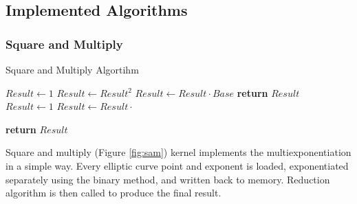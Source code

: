 \subsection{Implemented Algorithms}


\subsubsection{Square and Multiply}

\begin{algorithm}[h]
    \caption{Square and Multiply Algortihm \cite{knuth2014art}}\label{fig:sam}
    \begin{algorithmic}[1]
    
        \State $Result \gets 1$
            \State $Result \gets Result^2$
                \State $Result \gets Result \cdot Base$
            \EndIf
        \EndFor
        \State \textbf{return} $Result$
    \EndFunction
    \\
        \State $Result \gets 1$
            \State $Result \gets Result \cdot $
        \EndFor
    
        \State \textbf{return} $Result$
        
    \EndFunction
    \end{algorithmic}
\end{algorithm}
Square and multiply (Figure \ref{fig:sam}) kernel implements the multiexponentiation in a simple way. Every elliptic curve point and exponent is loaded, exponentiated separately using the binary method, and written back to memory. Reduction algorithm is then called to produce the final result.
